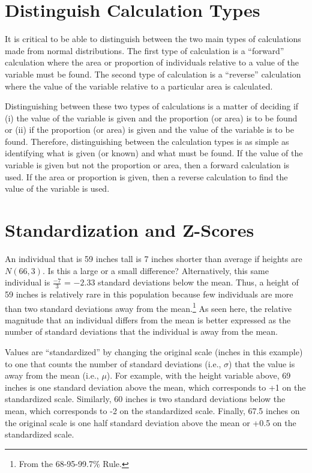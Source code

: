 \documentclass[10pt,openany]{book}\usepackage[]{graphicx}\usepackage[]{color}
\begin{document}
\section{Distinguish Calculation Types}
It is critical to be able to distinguish between the two main types of calculations made from normal distributions. The first type of calculation is a ``forward'' calculation where the area or proportion of individuals relative to a value of the variable must be found. The second type of calculation is a ``reverse'' calculation where the value of the variable relative to a particular area is calculated.

Distinguishing between these two types of calculations is a matter of deciding if (i) the value of the variable is given and the proportion (or area) is to be found or (ii) if the proportion (or area) is given and the value of the variable is to be found. Therefore, distinguishing between the calculation types is as simple as identifying what is given (or known) and what must be found. If the value of the variable is given but not the proportion or area, then a forward calculation is used. If the area or proportion is given, then a reverse calculation to find the value of the variable is used.


\section{Standardization and Z-Scores}\label{sect:Standardizing}
An individual that is 59 inches tall is 7 inches shorter than average if heights are $N(66,3)$. Is this a large or a small difference?  Alternatively, this same individual is $\frac{-7}{3}$ = $-2.33$ standard deviations below the mean. Thus, a height of 59 inches is relatively rare in this population because few individuals are more than two standard deviations away from the mean.\footnote{From the 68-95-99.7\% Rule.} As seen here, the relative magnitude that an individual differs from the mean is better expressed as the number of standard deviations that the individual is away from the mean.

Values are ``standardized'' by changing the original scale (inches in this example) to one that counts the number of standard deviations (i.e., $\sigma$) that the value is away from the mean (i.e., $\mu$). For example, with the height variable above, 69 inches is one standard deviation above the mean, which corresponds to +1 on the standardized scale. Similarly, 60 inches is two standard deviations below the mean, which corresponds to -2 on the standardized scale. Finally, 67.5 inches on the original scale is one half standard deviation above the mean or +0.5 on the standardized scale.
\end{document}
